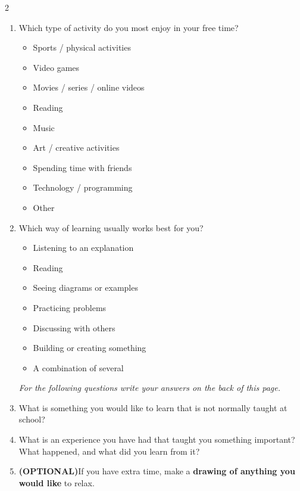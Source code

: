 \begin{minipage}{\dimexpr\textwidth+0.5cm\relax}
\begin{multicols}{2}
\begin{enumerate}
				\item Which type of activity do you most enjoy in your free time?
				
				\begin{itemize}[label={\raisebox{-0.2ex}{\huge$\square$}}, leftmargin=2em]
					\item Sports / physical activities
					\item Video games
					\item Movies / series / online videos
					\item Reading
					\item Music
					\item Art / creative activities
					\item Spending time with friends
					\item Technology / programming
					\item Other
				\end{itemize}
				
				\item Which way of learning usually works best for you?
				
				\begin{itemize}[label={\raisebox{-0.2ex}{\huge$\square$}}, leftmargin=2em]
					\item Listening to an explanation
					\item Reading
					\item Seeing diagrams or examples
					\item Practicing problems
					\item Discussing with others
					\item Building or creating something
					\item A combination of several
				\end{itemize}
				
				\begin{center}
					\textit{For the following questions write your answers on the back of this page.}
				\end{center}
				
				\item What is something you would like to learn that is not normally taught at school?
				
				\item What is an experience you have had that taught you something important? What happened, and what did you learn from it?
				
				\item \textbf{(OPTIONAL)}If you have extra time, make a \textbf{drawing of anything you would like} to relax.
				
			\end{enumerate}
		\end{multicols}
	\end{minipage}
	
